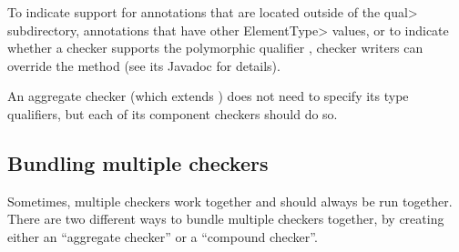 To indicate support for annotations that are located outside of the \<qual>
subdirectory, annotations that have other \<ElementType> values, or to indicate
whether a checker supports the polymorphic qualifier
, checker writers can override the
method (see its Javadoc for details).

An aggregate checker (which extends
) does not need to specify its
type qualifiers, but each of its component checkers should do so.


\subsection{Bundling multiple checkers\label{creating-bundling-multiple-checkers}}

Sometimes, multiple checkers work together and should always be run
together.  There are two different ways to bundle multiple checkers
together, by creating either an ``aggregate checker'' or a ``compound checker''.


